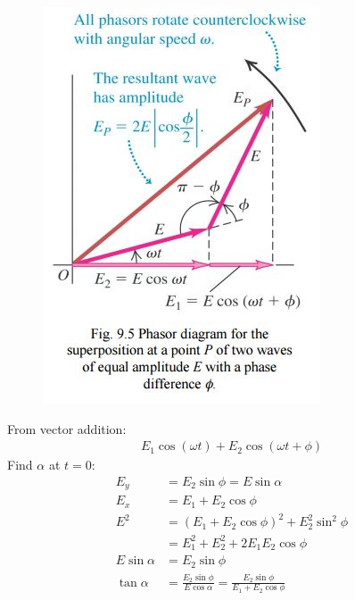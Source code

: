 \documentclass[a4paper, 11pt, normalem]{report}
\begin{document}
\begin{enumerate}
\begin{figure}[H]
            \includegraphics{Phasors.jpg}
        \end{figure}
        From vector addition:
        \begin{align}
            E_{1}\cos{(\omega t)} + E_{2}\cos{(\omega t + \phi)}
        \end{align}
        Find $\alpha$ at $t = 0$:
        \begin{align}
            E_{y} &= E_{2}\sin{\phi} = E\sin{\alpha} \\
            E_{x} &= E_{1} + E_{2}\cos{\phi} \\
            E^{2} &= (E_{1} + E_{2}\cos{\phi})^{2} + E_{2}^{2}\sin^{2}{\phi} \\
                  &= E_{1}^{2} + E_{2}^{2} + 2E_{1}E_{2}\cos{\phi} \\
            E\sin{\alpha} &= E_{2}\sin{\phi} \\
            \tan{\alpha} &= \frac{E_{2}\sin{\phi}}{E\cos{\alpha}} = \frac{E_{2}\sin{\phi}}{E_{1} + E_{2}\cos{\phi}}
        \end{align}
\end{enumerate}
\end{document}
